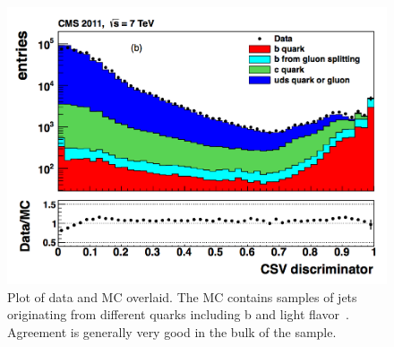 	
\begin{figure}[h]
\begin{center}
\includegraphics[width=0.9\linewidth]{Figs/CSV_discriminator_values.png}
\end{center}
\caption{\label{fig:csv_discriminant_values}
Plot of data and MC overlaid. The MC contains samples of jets originating from different quarks including b and light flavor~\cite{btagging}. Agreement is generally very good in the bulk of the sample.
}
\end{figure}
	
	
	
	
	
	
	
	
	
	